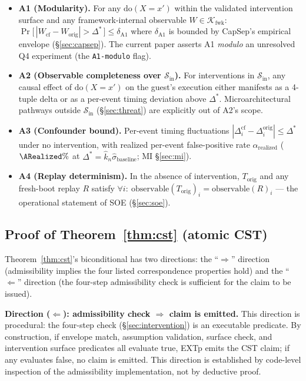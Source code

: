 \documentclass[conference]{IEEEtran}
\newcommand{\Korig}{T_\text{orig}}
\newcommand{\Kfwk}{\mathcal{K}_\text{fwk}}
\newcommand{\sigbase}{\hat{\sigma}_\text{baseline}}
\newcommand{\Dstar}{\Delta^{*}}
\newcommand{\arealized}{\alpha_\text{realized}}
\newcommand{\dox}[1]{\text{do}(X{=}#1)}
\begin{document}
\begin{itemize}[itemsep=2pt,topsep=2pt,leftmargin=*]
\item \textbf{A1 (Modularity).} For any $\dox{x'}$ within the
  validated intervention surface and any framework-internal
  observable $W \in \Kfwk$:
  $\Pr\big[\,|W_{\text{cf}} - W_{\text{orig}}| > \Dstar\,\big] \leq \delta_{\text{A1}}$
  where $\delta_{\text{A1}}$ is bounded by CapSep's empirical
  envelope (\S\ref{sec:capsep}). The current paper asserts A1
  \emph{modulo} an unresolved Q4 experiment (the
  \texttt{A1-modulo} flag).
\item \textbf{A2 (Observable completeness over $\mathcal{S}_\text{in}$).}
  For interventions in $\mathcal{S}_\text{in}$, any causal effect of
  $\dox{x'}$ on the guest's execution either manifests as a 4-tuple
  delta or as a per-event timing deviation above $\Dstar$.
  Microarchitectural pathways outside $\mathcal{S}_\text{in}$
  (\S\ref{sec:threat}) are explicitly out of A2's scope.
\item \textbf{A3 (Confounder bound).} Per-event timing fluctuations
  $|\Delta_i^{\text{cf}} - \Delta_i^{\text{orig}}| \le \Dstar$ under
  no intervention, with realized per-event false-positive rate
  $\arealized$ ($\ARealized\%$ at $\Dstar = \hat{k}_n\sigbase$; MI \S\ref{sec:mi}).
\item \textbf{A4 (Replay determinism).} In the absence of
  intervention, $\Korig$ and any fresh-boot replay $R$ satisfy
  $\forall i:\ \text{observable}(\Korig)_i = \text{observable}(R)_i$
  --- the operational statement of SOE (\S\ref{sec:soe}).
\end{itemize}

\subsection{Proof of Theorem~\ref{thm:cst} (atomic CST)}

Theorem~\ref{thm:cst}'s biconditional has two directions: the
``$\Rightarrow$'' direction (admissibility implies the four
listed correspondence properties hold) and the
``$\Leftarrow$'' direction (the four-step admissibility check is
sufficient for the claim to be issued).

\textbf{Direction ($\Leftarrow$): admissibility check $\Rightarrow$
claim is emitted.} This direction is procedural: the four-step
check (\S\ref{sec:intervention}) is an executable predicate. By
construction, if envelope match, assumption validation, surface
check, and intervention surface predicates all evaluate true,
EXTp emits the CST claim; if any evaluates false, no claim is
emitted. This direction is established by code-level inspection
of the admissibility implementation, not by deductive proof.
\end{document}
